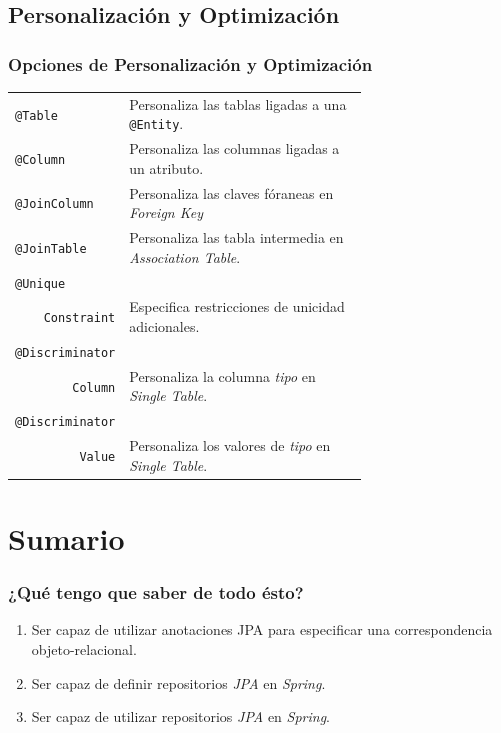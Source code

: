 \documentclass[a4paper,slidestop,xcolor=pst,blue]{beamer}
\newcommand{\ann}[1]{\color{blue}\texttt{#1}\color{black}}
\begin{document}
\subsection{Personalización y Optimización}

\begin{frame}[c]
    \frametitle{Opciones de Personalización y Optimización}
    \begin{tabular}{lp{0.70\linewidth}}
        \ann{@Table}      & Personaliza las tablas ligadas a una \ann{@Entity}. \\
        \ann{@Column}     & Personaliza las columnas ligadas a un atributo. \\
        \ann{@JoinColumn} & Personaliza las claves fóraneas en \emph{Foreign Key} \\ 
        \ann{@JoinTable } & Personaliza las tabla intermedia en \emph{Association Table}. \\
        \ann{@Unique}     & \\
        \multicolumn{1}{r}{\ann{Constraint}} & Especifica restricciones de unicidad adicionales. \\
        \ann{@Discriminator} &  \\
        \multicolumn{1}{r}{\ann{Column}} & Personaliza la columna \emph{tipo} en \emph{Single Table}. \\
        \ann{@Discriminator} &  \\
        \multicolumn{1}{r}{\ann{Value}} & Personaliza los valores de \emph{tipo} en \emph{Single Table}. \\
    \end{tabular}
\end{frame}

%
\section{Sumario}

\begin{frame}[c]
    \frametitle{¿Qué tengo que saber de todo ésto?}
    \begin{enumerate}[<+->]
        \item Ser capaz de utilizar anotaciones JPA para especificar una correspondencia objeto-relacional.
        \item Ser capaz de definir repositorios \emph{JPA} en \emph{Spring}.
        \item Ser capaz de utilizar repositorios \emph{JPA} en \emph{Spring}.
    \end{enumerate}
\end{frame}
\end{document}
